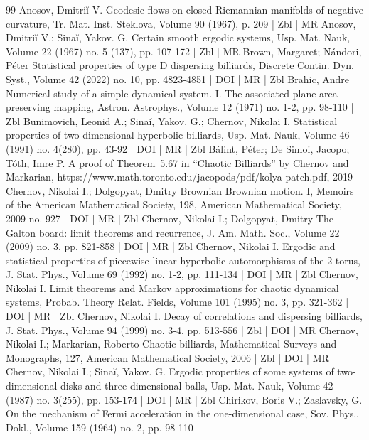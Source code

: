 \begin{thebibliography}{99}
Anosov, Dmitriĭ V. Geodesic flows on closed Riemannian manifolds of negative curvature, Tr. Mat. Inst. Steklova, Volume 90 (1967), p. 209 | Zbl | MR
Anosov, Dmitriĭ V.; Sinaĭ, Yakov. G. Certain smooth ergodic systems, Usp. Mat. Nauk, Volume 22 (1967) no. 5 (137), pp. 107-172 | Zbl | MR
Brown, Margaret; Nándori, Péter Statistical properties of type D dispersing billiards, Discrete Contin. Dyn. Syst., Volume 42 (2022) no. 10, pp. 4823-4851 | DOI | MR | Zbl
Brahic, Andre Numerical study of a simple dynamical system. I. The associated plane area-preserving mapping, Astron. Astrophys., Volume 12 (1971) no. 1-2, pp. 98-110 | Zbl
Bunimovich, Leonid A.; Sinaĭ, Yakov. G.; Chernov, Nikolai I. Statistical properties of two-dimensional hyperbolic billiards, Usp. Mat. Nauk, Volume 46 (1991) no. 4(280), pp. 43-92 | DOI | MR | Zbl
Bálint, Péter; De Simoi, Jacopo; Tóth, Imre P. A proof of Theorem 5.67 in “Chaotic Billiards” by Chernov and Markarian, https://www.math.toronto.edu/jacopods/pdf/kolya-patch.pdf, 2019
Chernov, Nikolai I.; Dolgopyat, Dmitry Brownian Brownian motion. I, Memoirs of the American Mathematical Society, 198, American Mathematical Society, 2009 no. 927 | DOI | MR | Zbl
Chernov, Nikolai I.; Dolgopyat, Dmitry The Galton board: limit theorems and recurrence, J. Am. Math. Soc., Volume 22 (2009) no. 3, pp. 821-858 | DOI | MR | Zbl
Chernov, Nikolai I. Ergodic and statistical properties of piecewise linear hyperbolic automorphisms of the 2-torus, J. Stat. Phys., Volume 69 (1992) no. 1-2, pp. 111-134 | DOI | MR | Zbl
Chernov, Nikolai I. Limit theorems and Markov approximations for chaotic dynamical systems, Probab. Theory Relat. Fields, Volume 101 (1995) no. 3, pp. 321-362 | DOI | MR | Zbl
Chernov, Nikolai I. Decay of correlations and dispersing billiards, J. Stat. Phys., Volume 94 (1999) no. 3-4, pp. 513-556 | Zbl | DOI | MR
Chernov, Nikolai I.; Markarian, Roberto Chaotic billiards, Mathematical Surveys and Monographs, 127, American Mathematical Society, 2006 | Zbl | DOI | MR
Chernov, Nikolai I.; Sinaĭ, Yakov. G. Ergodic properties of some systems of two-dimensional disks and three-dimensional balls, Usp. Mat. Nauk, Volume 42 (1987) no. 3(255), pp. 153-174 | DOI | MR | Zbl
Chirikov, Boris V.; Zaslavsky, G. On the mechanism of Fermi acceleration in the one-dimensional case, Sov. Phys., Dokl., Volume 159 (1964) no. 2, pp. 98-110

\end{thebibliography}
